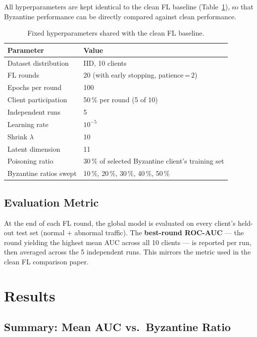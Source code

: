 \documentclass[11pt,a4paper]{article}
\begin{document}
All hyperparameters are kept identical to the clean FL baseline (Table~\ref{tab:setup}),
so that Byzantine performance can be directly compared against clean performance.

\begin{table}[h]
\centering
\caption{Fixed hyperparameters shared with the clean FL baseline.}
\label{tab:setup}
\begin{tabular}{ll}
\toprule
\textbf{Parameter} & \textbf{Value} \\
\midrule
Dataset distribution   & IID, 10 clients \\
FL rounds              & 20 (with early stopping, patience\,=\,2) \\
Epochs per round       & 100 \\
Client participation   & 50\,\% per round (5 of 10) \\
Independent runs       & 5 \\
Learning rate          & $10^{-5}$ \\
Shrink $\lambda$       & 10 \\
Latent dimension       & 11 \\
Poisoning ratio        & 30\,\% of selected Byzantine client's training set \\
\midrule
Byzantine ratios swept & 10\,\%, 20\,\%, 30\,\%, 40\,\%, 50\,\% \\
\bottomrule
\end{tabular}
\end{table}

\subsection{Evaluation Metric}

At the end of each FL round, the global model is evaluated on every client's held-out
test set (normal + abnormal traffic).
The \textbf{best-round ROC-AUC} --- the round yielding the highest mean AUC across all
10 clients --- is reported per run, then averaged across the 5 independent runs.
This mirrors the metric used in the clean FL comparison paper.

\section{Results}

\subsection{Summary: Mean AUC vs.\ Byzantine Ratio}
\end{document}
